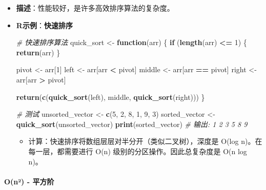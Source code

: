 \documentclass[
  twoside]{book}
\newenvironment{Shaded}{\begin{snugshade}}{\end{snugshade}}
\newcommand{\CommentTok}[1]{\textcolor[rgb]{0.56,0.35,0.01}{\textit{#1}}}
\newcommand{\ControlFlowTok}[1]{\textcolor[rgb]{0.13,0.29,0.53}{\textbf{#1}}}
\newcommand{\DecValTok}[1]{\textcolor[rgb]{0.00,0.00,0.81}{#1}}
\newcommand{\FunctionTok}[1]{\textcolor[rgb]{0.13,0.29,0.53}{\textbf{#1}}}
\newcommand{\NormalTok}[1]{#1}
\newcommand{\OtherTok}[1]{\textcolor[rgb]{0.56,0.35,0.01}{#1}}
\newcommand{\SpecialCharTok}[1]{\textcolor[rgb]{0.81,0.36,0.00}{\textbf{#1}}}
\providecommand{\tightlist}{%
  \setlength{\itemsep}{0pt}\setlength{\parskip}{0pt}}
\begin{document}
\begin{itemize}
\item
  \textbf{描述}：性能较好，是许多高效排序算法的复杂度。
\item
  \textbf{R示例}：\textbf{快速排序}

\begin{Shaded}
\begin{Highlighting}[]
\CommentTok{\# 快速排序算法}
\NormalTok{quick\_sort }\OtherTok{\textless{}{-}} \ControlFlowTok{function}\NormalTok{(arr) \{}
  \ControlFlowTok{if}\NormalTok{ (}\FunctionTok{length}\NormalTok{(arr) }\SpecialCharTok{\textless{}=} \DecValTok{1}\NormalTok{) \{}
    \FunctionTok{return}\NormalTok{(arr)}
\NormalTok{  \}}

\NormalTok{  pivot }\OtherTok{\textless{}{-}}\NormalTok{ arr[}\DecValTok{1}\NormalTok{]}
\NormalTok{  left }\OtherTok{\textless{}{-}}\NormalTok{ arr[arr }\SpecialCharTok{\textless{}}\NormalTok{ pivot]}
\NormalTok{  middle }\OtherTok{\textless{}{-}}\NormalTok{ arr[arr }\SpecialCharTok{==}\NormalTok{ pivot]}
\NormalTok{  right }\OtherTok{\textless{}{-}}\NormalTok{ arr[arr }\SpecialCharTok{\textgreater{}}\NormalTok{ pivot]}

  \FunctionTok{return}\NormalTok{(}\FunctionTok{c}\NormalTok{(}\FunctionTok{quick\_sort}\NormalTok{(left), middle, }\FunctionTok{quick\_sort}\NormalTok{(right)))}
\NormalTok{\}}

\CommentTok{\# 测试}
\NormalTok{unsorted\_vector }\OtherTok{\textless{}{-}} \FunctionTok{c}\NormalTok{(}\DecValTok{5}\NormalTok{, }\DecValTok{2}\NormalTok{, }\DecValTok{8}\NormalTok{, }\DecValTok{1}\NormalTok{, }\DecValTok{9}\NormalTok{, }\DecValTok{3}\NormalTok{)}
\NormalTok{sorted\_vector }\OtherTok{\textless{}{-}} \FunctionTok{quick\_sort}\NormalTok{(unsorted\_vector)}
\FunctionTok{print}\NormalTok{(sorted\_vector)  }\CommentTok{\# 输出: 1 2 3 5 8 9}
\end{Highlighting}
\end{Shaded}

  \begin{itemize}
  \tightlist
  \item
    计算：快速排序将数组层层对半分开（类似二叉树），深度是 O(log n)。在每一层，都需要进行 O(n) 级别的分区操作。因此总复杂度是 O(n log n)。
  \end{itemize}
\end{itemize}

\hypertarget{onuxb2---ux5e73ux65b9ux9636}{%
\paragraph{O(n²) - 平方阶}\label{onuxb2---ux5e73ux65b9ux9636}}
\end{document}
